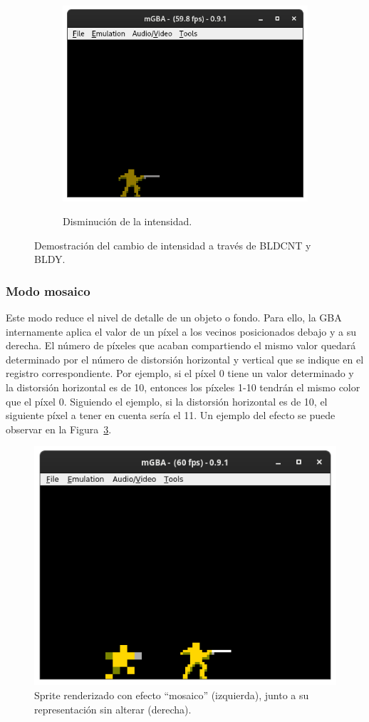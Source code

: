 \begin{figure}[h]
\begin{subfigure}[b]{0.45\textwidth}
         \includegraphics[width=\textwidth]{capitulos/capitulo3/brightness_4.png}
         \label{fig:blending_2}
	     \caption{Disminución de la intensidad.}
     \end{subfigure}
	\caption{Demostración del cambio de intensidad a través de BLDCNT y BLDY.}\label{fig:brightness}
\end{figure}
\FloatBarrier{}

\subsubsection{Modo mosaico}\label{sec:efectos_mosaico}
Este modo reduce el nivel de detalle de un objeto o fondo. Para ello, la GBA internamente aplica el valor de un píxel a los vecinos posicionados debajo y a su derecha. El número de píxeles que acaban compartiendo el mismo valor quedará determinado por el número de distorsión horizontal y vertical que se indique en el registro correspondiente. Por ejemplo, si el píxel 0 tiene un valor determinado y la distorsión horizontal es de 10, entonces los píxeles 1-10 tendrán el mismo color que el píxel 0. Siguiendo el ejemplo, si la distorsión horizontal es de 10, el siguiente píxel a tener en cuenta sería el 11.
Un ejemplo del efecto se puede observar en la Figura~\ref{fig:mosaic}.

		\begin{figure}[h]
			\centering
			\includegraphics[width=.45\textwidth]{capitulos/capitulo3/mosaic.png}
			\caption{Sprite renderizado con efecto ``mosaico'' (izquierda), junto a su representación sin alterar (derecha).}
			\label{fig:mosaic}
		\end{figure}
		\FloatBarrier



